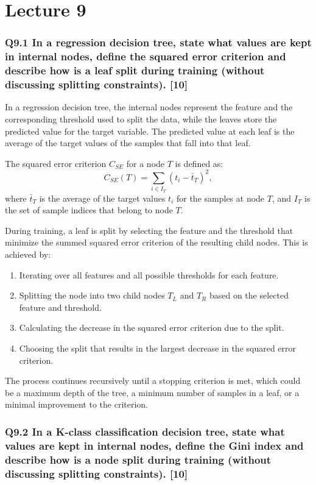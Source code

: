 \documentclass[11pt]{article}
\begin{document}
\part{Lecture 9}

\section{Q9.1 In a regression decision tree, state what values are kept in internal nodes, define the squared error criterion and describe how is a leaf split during training (without discussing splitting constraints). [10]}

In a regression decision tree, the internal nodes represent the feature and the corresponding threshold used to split the data, while the leaves store the predicted value for the target variable. The predicted value at each leaf is the average of the target values of the samples that fall into that leaf.

The squared error criterion \( C_{SE} \) for a node \( T \) is defined as:
\[
C_{SE}(T) = \sum_{i \in I_T} (t_i - \bar{t}_T)^2,
\]
where \( \bar{t}_T \) is the average of the target values \( t_i \) for the samples at node \( T \), and \( I_T \) is the set of sample indices that belong to node \( T \).

During training, a leaf is split by selecting the feature and the threshold that minimize the summed squared error criterion of the resulting child nodes. This is achieved by:
\begin{enumerate}
    \item Iterating over all features and all possible thresholds for each feature.
    \item Splitting the node into two child nodes \( T_L \) and \( T_R \) based on the selected feature and threshold.
    \item Calculating the decrease in the squared error criterion due to the split.
    \item Choosing the split that results in the largest decrease in the squared error criterion.
\end{enumerate}
The process continues recursively until a stopping criterion is met, which could be a maximum depth of the tree, a minimum number of samples in a leaf, or a minimal improvement to the criterion.

\section{Q9.2 In a K-class classification decision tree, state what values are kept in internal nodes, define the Gini index and describe how is a node split during training (without discussing splitting constraints). [10]}
\end{document}
